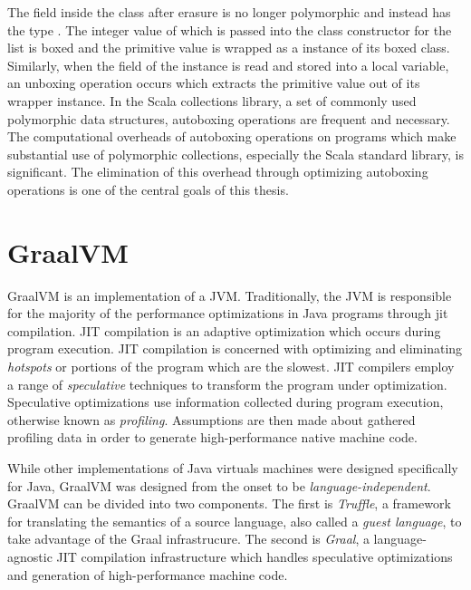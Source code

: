 The  field inside the  class after erasure is no longer polymorphic and instead has the type . 
The integer value of  which is passed into the class constructor for the list is boxed and the primitive value is wrapped as a instance of its boxed class.
Similarly, when the  field of the instance is read and stored into a local variable, an unboxing operation occurs which extracts the primitive value out of its wrapper instance.
In the Scala collections library, a set of commonly used polymorphic data structures, autoboxing operations are frequent and necessary.
The computational overheads of autoboxing operations on programs which make substantial use of polymorphic collections, especially the Scala standard library, is significant\cite{scala:collections-optimization}.
The elimination of this overhead through optimizing autoboxing operations is one of the central goals of this thesis.

\section{GraalVM}

GraalVM\cite{java:graalvm} is an implementation of a JVM.
Traditionally, the JVM is responsible for the majority of the performance optimizations in Java programs\cite{java:hotspot} through \acrfull{jit} compilation.
JIT compilation is an adaptive optimization which occurs during program execution.
JIT compilation is concerned with optimizing and eliminating \textit{hotspots} or portions of the program which are the slowest.
JIT compilers\cite{java:sablevm}\cite{java:jikesrvm} employ a range of \textit{speculative} techniques to transform the program under optimization.
Speculative optimizations use information collected during program execution, otherwise known as \textit{profiling}. 
Assumptions are then made about gathered profiling data in order to generate high-performance native machine code.

While other implementations of Java virtuals machines were designed specifically for Java, GraalVM was designed from the onset to be \textit{language-independent}.
GraalVM can be divided into two components. 
The first is \textit{Truffle}, a framework for translating the semantics of a source language, also called a \textit{guest language}, to take advantage of the Graal infrastrucure.
The second is \textit{Graal}, a language-agnostic JIT compilation infrastructure which handles speculative optimizations and generation of high-performance machine code.

